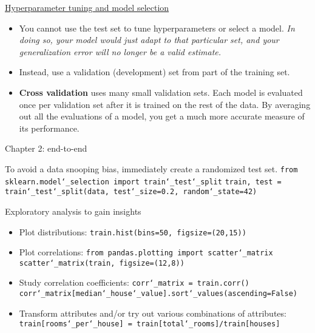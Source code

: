 \underline{Hyperparameter tuning and model selection}
\begin{itemize}
\vspace{-3.0mm}
\item
You cannot use the test set to tune hyperparameters or select a model.\newline
\textit{In doing so, your model would just adapt to that particular set,
and your generalization error will no longer be a valid estimate.}
\item
Instead, use a validation (development) set from part of the training set.
\item
\textbf{Cross validation} uses many small validation sets.
Each model is evaluated once per validation set after it is trained on the rest of the data.
By averaging out all the evaluations of a model,
you get a much more accurate measure of its performance.
\end{itemize}




Chapter 2: end-to-end

To avoid a data snooping bias, immediately create a randomized test set.\newline
\texttt{from sklearn.model\char`_selection import train\char`_test\char`_split}\newline
\texttt{train, test = train\char`_test\char`_split(data, test\char`_size=0.2, random\char`_state=42)}\newline

Exploratory analysis to gain insights
\begin{itemize}
\vspace{-3.0mm}
\item
Plot distributions:\newline
\texttt{train.hist(bins=50, figsize=(20,15))} 
\item
Plot correlations:\newline
\texttt{from pandas.plotting import scatter\char`_matrix}\newline
\texttt{scatter\char`_matrix(train, figsize=(12,8))}
\item
Study correlation coefficients:\newline
\texttt{corr\char`_matrix = train.corr()}\newline
\texttt{corr\char`_matrix[\textquotesingle median\char`_house\char`_value\textquotesingle].sort\char`_values(ascending=False)}
\item
Transform attributes and/or try out various combinations of attributes:\newline
\texttt{train[\textquotesingle rooms\char`_per\char`_house\textquotesingle] = train[\textquotesingle total\char`_rooms\textquotesingle]/train[\textquotesingle houses\textquotesingle]}\newline
\end{itemize}

